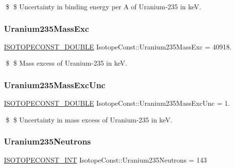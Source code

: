 \$ \$ Uncertainty in binding energy per A of Uranium-\/235 in keV. \mbox{\label{group___isotope_const-_uranium-_u235_gaf6a3ffa9fd735867636bf347570a5d43}} 
\subsubsection{\texorpdfstring{Uranium235\+Mass\+Exc}{Uranium235MassExc}}
{\footnotesize\ttfamily \mbox{\hyperlink{group___isotope_const-_macros_ga8f45a7272ce02c0b4c65c44636ed719a}{I\+S\+O\+T\+O\+P\+E\+C\+O\+N\+S\+T\+\_\+\+D\+O\+U\+B\+LE}} Isotope\+Const\+::\+Uranium235\+Mass\+Exc = 40918.}

\$ \$ Mass excess of Uranium-\/235 in keV. \mbox{\label{group___isotope_const-_uranium-_u235_gac6f3de66cfc208de269d7e9308c67b9e}} 
\subsubsection{\texorpdfstring{Uranium235\+Mass\+Exc\+Unc}{Uranium235MassExcUnc}}
{\footnotesize\ttfamily \mbox{\hyperlink{group___isotope_const-_macros_ga8f45a7272ce02c0b4c65c44636ed719a}{I\+S\+O\+T\+O\+P\+E\+C\+O\+N\+S\+T\+\_\+\+D\+O\+U\+B\+LE}} Isotope\+Const\+::\+Uranium235\+Mass\+Exc\+Unc = 1.}

\$ \$ Uncertainty in mass excess of Uranium-\/235 in keV. \mbox{\label{group___isotope_const-_uranium-_u235_gaacb7a4cf1020f48dc72672fed4969a70}} 
\subsubsection{\texorpdfstring{Uranium235\+Neutrons}{Uranium235Neutrons}}
{\footnotesize\ttfamily \mbox{\hyperlink{group___isotope_const-_macros_ga5f18360b3e99483a35c32d789e62621c}{I\+S\+O\+T\+O\+P\+E\+C\+O\+N\+S\+T\+\_\+\+I\+NT}} Isotope\+Const\+::\+Uranium235\+Neutrons = 143}

